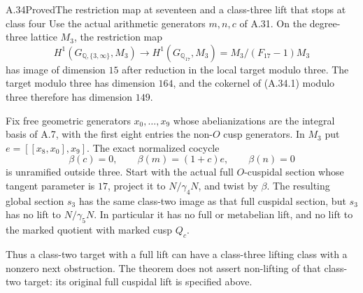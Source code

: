 \begin{statement}{A.34}{Proved}{The restriction map at seventeen and a class-three lift that stops at class four}
Use the actual arithmetic generators $m,n,c$ of A.31.
On the degree-three lattice $M_3$, the restriction map
\[
 H^1(G_{\mathbb Q,\{3,\infty\}},M_3)
 \longrightarrow H^1(G_{\mathbb Q_{17}},M_3)
                         =M_3/(F_{17}-1)M_3
 \tag{A.34.1}
\]
has image of dimension $15$ after reduction in the local
target modulo three. The target modulo three has dimension
$164$, and the cokernel of (A.34.1) modulo three therefore
has dimension $149$.

Fix free geometric generators $x_0,\ldots,x_9$ whose
abelianizations are the integral basis of A.7, with the
first eight entries the non-$O$ cusp generators. In $M_3$
put $e=[[x_8,x_0],x_9]$. The exact normalized cocycle
\[
 \beta(c)=0,\qquad \beta(m)=(1+c)e,
                  \qquad\beta(n)=0
 \tag{A.34.2}
\]
is unramified outside three. Start with the actual full
$O$-cuspidal section whose tangent parameter is $17$,
project it to $N/\gamma_4N$, and twist by $\beta$.
The resulting global section $s_3$ has the same class-two
image as that full cuspidal section, but $s_3$ has no lift
to $N/\gamma_5N$. In particular it has no full or
metabelian lift, and no lift to the marked quotient with
marked cusp $Q_c$.

Thus a class-two target with a full lift can have a
class-three lifting class with a nonzero next obstruction.
The theorem does not assert non-lifting of that class-two
target: its original full cuspidal lift is specified above.
\end{statement}
